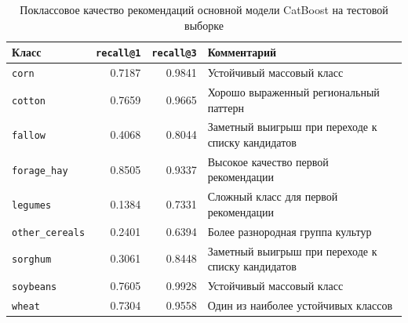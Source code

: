 \begin{table}[H]
\centering
\small
\caption{Поклассовое качество рекомендаций основной модели CatBoost на тестовой выборке}
\label{tab:per-class-recommendation-metrics}
\begin{tabular}{lrrp{}}
\toprule
Класс & \texttt{recall@1} & \texttt{recall@3} & Комментарий \\
\midrule
\texttt{corn} & 0.7187 & 0.9841 & Устойчивый массовый класс \\
\texttt{cotton} & 0.7659 & 0.9665 & Хорошо выраженный региональный паттерн \\
\texttt{fallow} & 0.4068 & 0.8044 & Заметный выигрыш при переходе к списку кандидатов \\
\texttt{forage\_hay} & 0.8505 & 0.9337 & Высокое качество первой рекомендации \\
\texttt{legumes} & 0.1384 & 0.7331 & Сложный класс для первой рекомендации \\
\texttt{other\_cereals} & 0.2401 & 0.6394 & Более разнородная группа культур \\
\texttt{sorghum} & 0.3061 & 0.8448 & Заметный выигрыш при переходе к списку кандидатов \\
\texttt{soybeans} & 0.7605 & 0.9928 & Устойчивый массовый класс \\
\texttt{wheat} & 0.7304 & 0.9558 & Один из наиболее устойчивых классов \\
\bottomrule
\end{tabular}

\end{table}
